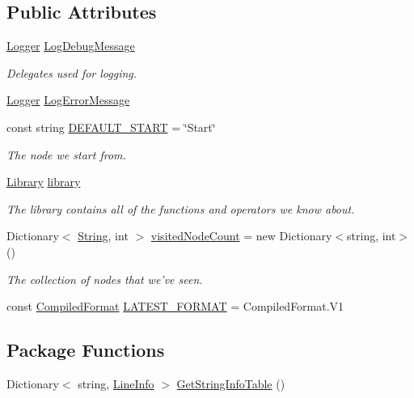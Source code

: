 \subsection*{Public Attributes}
\begin{DoxyCompactItemize}
\item 
\hyperlink{a00048_a1e50031b945a3a2afafee6f590730568}{Logger} \hyperlink{a00088_a381f48bb0fbb294f8cf44ca57f11be31}{Log\-Debug\-Message}
\begin{DoxyCompactList}\small\item\em Delegates used for logging. \end{DoxyCompactList}\item 
\hyperlink{a00048_a1e50031b945a3a2afafee6f590730568}{Logger} \hyperlink{a00088_a9801e83dd044d6498fdf6ebcc6bec5ac}{Log\-Error\-Message}
\item 
const string \hyperlink{a00088_a1b643f15f734090e6a58cbf13dafd28f}{D\-E\-F\-A\-U\-L\-T\-\_\-\-S\-T\-A\-R\-T} = \char`\"{}Start\char`\"{}
\begin{DoxyCompactList}\small\item\em The node we start from. \end{DoxyCompactList}\item 
\hyperlink{a00121}{Library} \hyperlink{a00088_ae660d4cfb6e296358d2f61d8ee74c66a}{library}
\begin{DoxyCompactList}\small\item\em The library contains all of the functions and operators we know about. \end{DoxyCompactList}\item 
Dictionary$<$ \hyperlink{a00048_a301aa7c866593a5b625a8fc158bbeacea27118326006d3829667a400ad23d5d98}{String}, int $>$ \hyperlink{a00088_aae9e64354066a1e2fa130629959d772b}{visited\-Node\-Count} = new Dictionary$<$string, int$>$()
\begin{DoxyCompactList}\small\item\em The collection of nodes that we've seen. \end{DoxyCompactList}\item 
const \hyperlink{a00088_a903f18cdcc66c28ceab5a43c41fe074d}{Compiled\-Format} \hyperlink{a00088_a3bc83587462ade6a2f7f42cb7576e50e}{L\-A\-T\-E\-S\-T\-\_\-\-F\-O\-R\-M\-A\-T} = Compiled\-Format.\-V1
\end{DoxyCompactItemize}
\subsection*{Package Functions}
\begin{DoxyCompactItemize}
\item 
Dictionary$<$ string, \hyperlink{a00123}{Line\-Info} $>$ \hyperlink{a00088_a5c5117de678626ebcfb9a6f875e6e53a}{Get\-String\-Info\-Table} ()
\end{DoxyCompactItemize}
